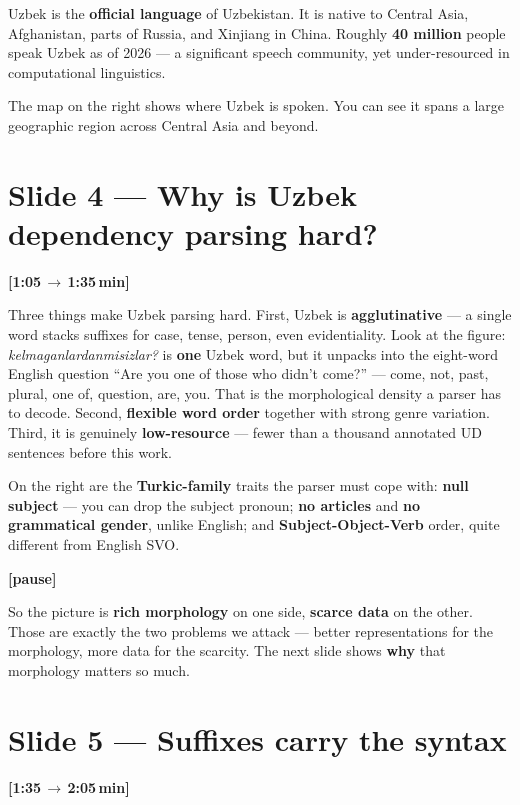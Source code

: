 \documentclass[12pt,a4paper]{article}
\newcommand{\timing}[2]{%
   \par\noindent\textbf{\small [#1\,$\to$\,#2\,min]}\par\vspace{0.2em}}
\newcommand{\say}[1]{\textbf{#1}}
\newcommand{\pause}{\par\vspace{0.4em}\textbf{[pause]}\par}
\begin{document}
Uzbek is the \say{official language} of Uzbekistan. It is native to
Central Asia, Afghanistan, parts of Russia, and Xinjiang in China.
Roughly \textbf{40 million} people speak Uzbek as of 2026 --- a
significant speech community, yet under-resourced in computational
linguistics.

The map on the right shows where Uzbek is spoken. You can see it spans
a large geographic region across Central Asia and beyond.

\section*{Slide 4 --- Why is Uzbek dependency parsing hard?}
\timing{1:05}{1:35}

Three things make Uzbek parsing hard. First, Uzbek is \say{agglutinative}
--- a single word stacks suffixes for case, tense, person, even
evidentiality. Look at the figure: \textit{kelmaganlardanmisizlar?} is
\say{one} Uzbek word, but it unpacks into the eight-word English question
``Are you one of those who didn't come?'' --- come, not, past, plural, one
of, question, are, you. That is the morphological density a parser has to
decode. Second, \say{flexible word order} together with strong genre
variation. Third, it is genuinely \say{low-resource} --- fewer than a
thousand annotated UD sentences before this work.

On the right are the \textbf{Turkic-family} traits the parser must cope
with: \say{null subject} --- you can drop the subject pronoun;
\say{no articles} and \say{no grammatical gender}, unlike English; and
\textbf{Subject-Object-Verb} order, quite different from English SVO.

\pause

So the picture is \say{rich morphology} on one side, \say{scarce data} on
the other. Those are exactly the two problems we attack --- better
representations for the morphology, more data for the scarcity. The next
slide shows \say{why} that morphology matters so much.

\section*{Slide 5 --- Suffixes carry the syntax}
\timing{1:35}{2:05}
\end{document}
